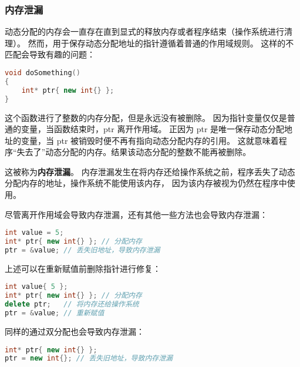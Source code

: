 \documentclass[../../LearnCpp.tex]{subfiles}
\begin{document}
\subsubsection*{内存泄漏}

动态分配的内存会一直存在直到显式的释放内存或者程序结束（操作系统进行清理）。
然而，用于保存动态分配地址的指针遵循着普通的作用域规则。
这样的不匹配会导致有趣的问题：

\begin{lstlisting}[language=C++]
void doSomething()
{
    int* ptr{ new int{} };
}
\end{lstlisting}

这个函数进行了整数的内存分配，但是永远没有被删除。
因为指针变量仅仅是普通的变量，当函数结束时，ptr 离开作用域。
正因为 ptr 是唯一保存动态分配地址的变量，当 ptr 被销毁时便不再有指向动态分配内存的引用。
这就意味着程序“失去了”动态分配的内存。结果该动态分配的整数不能再被删除。

这被称为\textbf{内存泄漏}。
内存泄漏发生在将内存还给操作系统之前，程序丢失了动态分配内存的地址，操作系统不能使用该内存，
因为该内存被视为仍然在程序中使用。

尽管离开作用域会导致内存泄漏，还有其他一些方法也会导致内存泄漏：

\begin{lstlisting}[language=C++]
int value = 5;
int* ptr{ new int{} }; // 分配内存
ptr = &value; // 丢失旧地址，导致内存泄漏
\end{lstlisting}

上述可以在重新赋值前删除指针进行修复：

\begin{lstlisting}[language=C++]
int value{ 5 };
int* ptr{ new int{} }; // 分配内存
delete ptr;   // 将内存还给操作系统
ptr = &value; // 重新赋值
\end{lstlisting}

同样的通过双分配也会导致内存泄漏：

\begin{lstlisting}[language=C++]
int* ptr{ new int{} };
ptr = new int{}; // 丢失旧地址，导致内存泄漏
\end{lstlisting}
\end{document}
